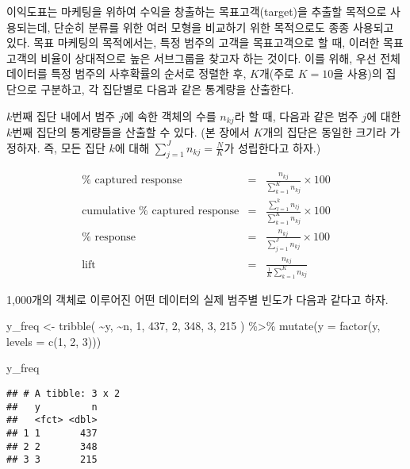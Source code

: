 \documentclass[
]{book}
\newenvironment{Shaded}{\begin{snugshade}}{\end{snugshade}}
\newcommand{\AttributeTok}[1]{\textcolor[rgb]{0.77,0.63,0.00}{#1}}
\newcommand{\DecValTok}[1]{\textcolor[rgb]{0.00,0.00,0.81}{#1}}
\newcommand{\FunctionTok}[1]{\textcolor[rgb]{0.00,0.00,0.00}{#1}}
\newcommand{\NormalTok}[1]{#1}
\newcommand{\OtherTok}[1]{\textcolor[rgb]{0.56,0.35,0.01}{#1}}
\newcommand{\SpecialCharTok}[1]{\textcolor[rgb]{0.00,0.00,0.00}{#1}}
\begin{document}
이익도표는 마케팅을 위하여 수익을 창출하는 목표고객(target)을 추출할 목적으로 사용되는데, 단순히 분류를 위한 여러 모형을 비교하기 위한 목적으로도 종종 사용되고 있다. 목표 마케팅의 목적에서는, 특정 범주의 고객을 목표고객으로 할 때, 이러한 목표고객의 비율이 상대적으로 높은 서브그룹을 찾고자 하는 것이다. 이를 위해, 우선 전체 데이터를 특정 범주의 사후확률의 순서로 정렬한 후, \(K\)개(주로 \(K = 10\)을 사용)의 집단으로 구분하고, 각 집단별로 다음과 같은 통계량을 산출한다.

\(k\)번째 집단 내에서 범주 \(j\)에 속한 객체의 수를 \(n_{kj}\)라 할 때, 다음과 같은 범주 \(j\)에 대한 \(k\)번째 집단의 통계량들을 산출할 수 있다. (본 장에서 \(K\)개의 집단은 동일한 크기라 가정하자. 즉, 모든 집단 \(k\)에 대해 \(\sum_{j = 1}^{J} n_{kj} = \frac{N}{K}\)가 성립한다고 하자.)

\begin{eqnarray*}
\text{$\%$ captured response} &=& \frac{n_{kj}}{\sum_{k = 1}^{K} n_{kj}} \times 100\\
\text{cumulative $\%$ captured response} &=& \frac{\sum_{l = 1}^{k} n_{lj}}{\sum_{k = 1}^{K} n_{kj}} \times 100\\
\text{$\%$ response} &=& \frac{n_{kj}}{\sum_{j = 1}^{J} n_{kj}} \times 100\\
\text{lift} &=& \frac{n_{kj}}{\frac{1}{K} \sum_{k = 1}^{K} n_{kj}}
\end{eqnarray*}

1,000개의 객체로 이루어진 어떤 데이터의 실제 범주별 빈도가 다음과 같다고 하자.

\begin{Shaded}
\begin{Highlighting}[]
\NormalTok{y\_freq }\OtherTok{\textless{}{-}} \FunctionTok{tribble}\NormalTok{(}
  \SpecialCharTok{\textasciitilde{}}\NormalTok{y, }\SpecialCharTok{\textasciitilde{}}\NormalTok{n,}
  \DecValTok{1}\NormalTok{, }\DecValTok{437}\NormalTok{,}
  \DecValTok{2}\NormalTok{, }\DecValTok{348}\NormalTok{,}
  \DecValTok{3}\NormalTok{, }\DecValTok{215}
\NormalTok{) }\SpecialCharTok{\%\textgreater{}\%}
  \FunctionTok{mutate}\NormalTok{(}\AttributeTok{y =} \FunctionTok{factor}\NormalTok{(y, }\AttributeTok{levels =} \FunctionTok{c}\NormalTok{(}\DecValTok{1}\NormalTok{, }\DecValTok{2}\NormalTok{, }\DecValTok{3}\NormalTok{)))}

\NormalTok{y\_freq}
\end{Highlighting}
\end{Shaded}

\begin{verbatim}
## # A tibble: 3 x 2
##   y         n
##   <fct> <dbl>
## 1 1       437
## 2 2       348
## 3 3       215
\end{verbatim}
\end{document}
